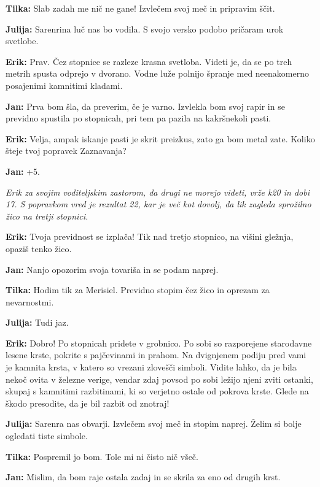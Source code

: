 \textbf{Tilka:} Slab zadah me nič ne gane! Izvlečem svoj meč in pripravim ščit.

\textbf{Julija:} Sarenrina luč nas bo vodila. S svojo versko podobo pričaram urok svetlobe.

\textbf{Erik:} Prav. Čez stopnice se razleze krasna svetloba. Videti je, da se po treh metrih spusta odprejo v dvorano. Vodne luže polnijo špranje med neenakomerno posajenimi kamnitimi kladami.

\textbf{Jan:} Prva bom šla, da preverim, če je varno. Izvlekla bom svoj rapir in se previdno spustila po stopnicah, pri tem pa pazila na kakršnekoli pasti.

\textbf{Erik:} Velja, ampak iskanje pasti je skrit preizkus, zato ga bom metal zate. Koliko šteje tvoj popravek Zaznavanja?

\textbf{Jan:} +5.

\vspace{20pt}

\textit{Erik za svojim voditeljskim zastorom, da drugi ne morejo videti, vrže k20 in dobi 17. S popravkom vred je rezultat 22, kar je več kot dovolj, da lik zagleda sprožilno žico na tretji stopnici.}

\vspace{20pt}

\textbf{Erik:} Tvoja previdnost se izplača! Tik nad tretjo stopnico, na višini gležnja, opaziš tenko žico.

\textbf{Jan:} Nanjo opozorim svoja tovariša in se podam naprej.

\textbf{Tilka:} Hodim tik za Merisiel. Previdno stopim čez žico in oprezam za nevarnostmi.

\textbf{Julija:} Tudi jaz.

\textbf{Erik:} Dobro! Po stopnicah pridete v grobnico. Po sobi so razporejene starodavne lesene krste, pokrite s pajčevinami in prahom. Na dvignjenem podiju pred vami je kamnita krsta, v katero so vrezani zlovešči simboli. Vidite lahko, da je bila nekoč ovita v železne verige, vendar zdaj povsod po sobi ležijo njeni zviti ostanki, skupaj s kamnitimi razbitinami, ki so verjetno ostale od pokrova krste. Glede na škodo presodite, da je bil razbit od znotraj!

\textbf{Julija:} Sarenra nas obvarji. Izvlečem svoj meč in stopim naprej. Želim si bolje ogledati tiste simbole.

\textbf{Tilka:} Pospremil jo bom. Tole mi ni čisto nič všeč.

\textbf{Jan:} Mislim, da bom raje ostala zadaj in se skrila za eno od drugih krst.

